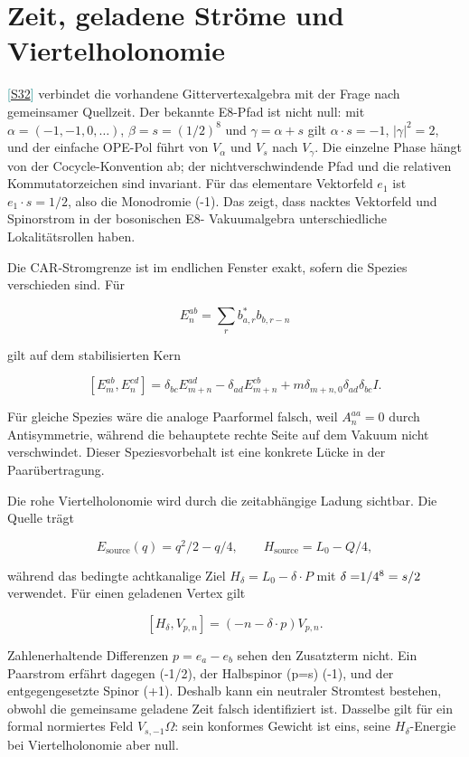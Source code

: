 \documentclass[11pt,a4paper,oneside,parskip=half,headings=normal,numbers=noenddot,bibliography=totoc]{scrreprt}
\newcommand{\src}[1]{\textcolor{teal}{\small[\hyperref[s:#1]{S#1}]}}
\begin{document}
\section{Zeit, geladene Ströme und Viertelholonomie}

\src{32} verbindet die vorhandene Gittervertexalgebra mit
der Frage nach gemeinsamer Quellzeit. Der bekannte E8-Pfad ist nicht null:
mit \(\alpha=(-1,-1,0,\ldots)\), \(\beta=s=(1/2)^8\) und
\(\gamma=\alpha+s\) gilt \(\alpha\cdot s=-1\), \(\lvert\gamma\rvert^2=2\), und der
einfache OPE-Pol führt von \(V_\alpha\) und \(V_s\) nach \(V_\gamma\).
Die einzelne Phase hängt von der Cocycle-Konvention ab; der nichtverschwindende
Pfad und die relativen Kommutatorzeichen sind invariant. Für das elementare
Vektorfeld \(e_1\) ist \(e_1\cdot s=1/2\), also die Monodromie (-1). Das
zeigt, dass nacktes Vektorfeld und Spinorstrom in der bosonischen E8-
Vakuumalgebra unterschiedliche Lokalitätsrollen haben.

Die CAR-Stromgrenze ist im endlichen Fenster exakt, sofern die Spezies
verschieden sind. Für

\[
 E_n^{ab}=\sum_r b^*_{a,r}b_{b,r-n}
\]

gilt auf dem stabilisierten Kern

\[
 [E_m^{ab},E_n^{cd}]
 =\delta_{bc}E_{m+n}^{ad}-\delta_{ad}E_{m+n}^{cb}
 +m\delta_{m+n,0}\delta_{ad}\delta_{bc}I.
\]

Für gleiche Spezies wäre die analoge Paarformel falsch, weil
\(A_n^{aa}=0\) durch Antisymmetrie, während die behauptete rechte Seite auf
dem Vakuum nicht verschwindet. Dieser Speziesvorbehalt ist eine konkrete
Lücke in der Paarübertragung.

Die rohe Viertelholonomie wird durch die zeitabhängige Ladung sichtbar. Die
Quelle trägt

\[
 E_\mathrm{source}(q)=q^2/2-q/4,
 \qquad H_\mathrm{source}=L_0-Q/4,
\]

während das bedingte achtkanalige Ziel \(H_\delta=L_0-\delta\cdot P\) mit
\(\delta=$1/4$^8=s/2\) verwendet. Für einen geladenen Vertex gilt

\[
 [H_\delta,V_{p,n}]=(-n-\delta\cdot p)V_{p,n}.
\]

Zahlenerhaltende Differenzen \(p=e_a-e_b\) sehen den Zusatzterm nicht. Ein
Paarstrom erfährt dagegen (-1/2), der Halbspinor (p=s) (-1), und der
entgegengesetzte Spinor (+1). Deshalb kann ein neutraler Stromtest bestehen,
obwohl die gemeinsame geladene Zeit falsch identifiziert ist. Dasselbe gilt
für ein formal normiertes Feld \(V_{s,-1}\Omega\): sein konformes Gewicht ist
eins, seine \(H_\delta\)-Energie bei Viertelholonomie aber null.
\end{document}
